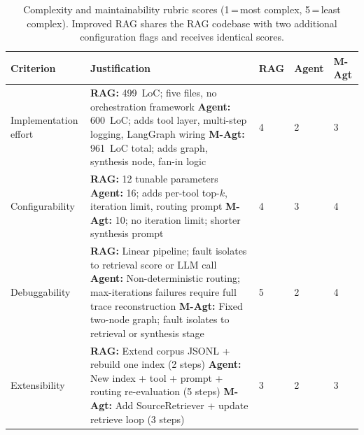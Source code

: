 \begin{table}[ht]
\centering
\small
\setlength{\tabcolsep}{4pt}
\caption{Complexity and maintainability rubric scores (1\,=\,most complex, 5\,=\,least complex). Improved RAG shares the RAG codebase with two additional configuration flags and receives identical scores.}
\label{tab:rubric}
\renewcommand{\arraystretch}{1.15}
\begin{tabular}{>{\raggedright\arraybackslash}p{2.9cm}%
                >{\raggedright\arraybackslash}p{7.0cm}%
                >{\centering\arraybackslash}p{0.95cm}%
                >{\centering\arraybackslash}p{1.0cm}%
                >{\centering\arraybackslash}p{1.2cm}}
\hline
\textbf{Criterion} & \textbf{Justification} & \textbf{RAG} & \textbf{Agent} & \textbf{M-Agt} \\
\hline
Implementation effort &
  \textbf{RAG:} 499~LoC; five files, no orchestration framework\newline
  \textbf{Agent:} 600~LoC; adds tool layer, multi-step logging, LangGraph wiring\newline
  \textbf{M-Agt:} 961~LoC total; adds graph, synthesis node, fan-in logic &
  \cellcolor{green!15}4 & \cellcolor{orange!25}2 & \cellcolor{yellow!35}3 \\[2pt]
Configurability &
  \textbf{RAG:} 12 tunable parameters\newline
  \textbf{Agent:} 16; adds per-tool top-$k$, iteration limit, routing prompt\newline
  \textbf{M-Agt:} 10; no iteration limit; shorter synthesis prompt &
  \cellcolor{green!15}4 & \cellcolor{yellow!35}3 & \cellcolor{green!15}4 \\[2pt]
Debuggability &
  \textbf{RAG:} Linear pipeline; fault isolates to retrieval score or LLM call\newline
  \textbf{Agent:} Non-deterministic routing; max-iterations failures require full trace reconstruction\newline
  \textbf{M-Agt:} Fixed two-node graph; fault isolates to retrieval or synthesis stage &
  \cellcolor{green!30}5 & \cellcolor{orange!25}2 & \cellcolor{green!15}4 \\[2pt]
Extensibility &
  \textbf{RAG:} Extend corpus JSONL + rebuild one index (2 steps)\newline
  \textbf{Agent:} New index + tool + prompt + routing re-evaluation (5 steps)\newline
  \textbf{M-Agt:} Add SourceRetriever + update retrieve loop (3 steps) &
  \cellcolor{yellow!35}3 & \cellcolor{orange!25}2 & \cellcolor{yellow!35}3 \\[2pt]

\end{tabular}
\end{table}
